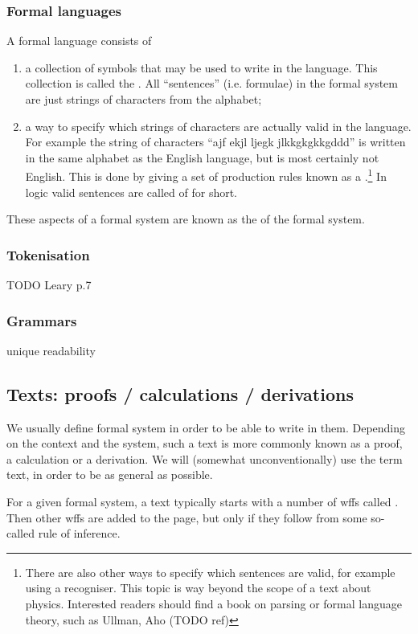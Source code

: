\subsubsection{Formal languages}
A formal language consists of 
\begin{enumerate}
\item a collection of symbols that may be used to write in the language. This collection is called the . All ``sentences'' (i.e. formulae) in the formal system are just strings of characters from the alphabet;
\item a way to specify which strings of characters are actually valid in the language. For example the string of characters ``ajf ekjl ljegk jlkkgkgkkgddd'' is written in the same alphabet as the English language, but is most certainly not English. This is done by giving a set of production rules known as a .\footnote{There are also other ways to specify which sentences are valid, for example using a recogniser. This topic is way beyond the scope of a text about physics. Interested readers should find a book on parsing or formal language theory, such as Ullman, Aho (TODO ref)} In logic valid sentences are called  of  for short.
\end{enumerate}
These aspects of a formal system are known as the  of the formal system.

\subsubsection{Tokenisation}
TODO Leary p.7

\subsubsection{Grammars}
unique readability

\subsection{Texts: proofs / calculations / derivations}
We usually define formal system in order to be able to write  in them. Depending on the context and the system, such a text is more commonly known as a proof, a calculation or a derivation. We will (somewhat unconventionally) use the term text, in order to be as general as possible.

For a given formal system, a text typically starts with a number of wffs called . Then other wffs are added to the page, but only if they follow from some so-called rule of inference.

